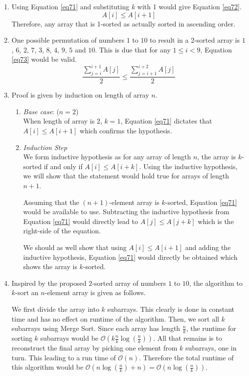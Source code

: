 \begin{enumerate}[label=(\alph*)]
\item Using Equation \ref{eq71} and substituting $k$ with 1 would give Equation \ref{eq72}.
\begin{equation}\label{eq72}
A[i] \leq A[i+1]
\end{equation}
Therefore, any array that is 1-sorted as actually sorted in ascending order.
\item One possible permutation of numbers $1$ to $10$ to result in a 2-sorted array is $1$, $6$, $2$, $7$, $3$, $8$, $4$, $9$, $5$ and $10$.
This is due that for any $1 \leq i < 9$, Equation \ref{eq73} would be valid.
\begin{equation}\label{eq73}
\frac{\sum_{j=i}^{i + 1} A[j]}{2} \leq \frac{\sum_{j=i+1}^{i + 2} A[j]}{2}
\end{equation}
\item Proof is given by induction on length of array $n$.
\begin{enumerate}
\item[] \textit{Base case}: ($n = 2$)\\
When length of array is 2, $k = 1$, Equation \ref{eq71} dictates that $A[i] \leq A[i+1]$ which confirms the hypothesis.
\item[] \textit{Induction Step}\\
We form inductive hypothesis as for any array of length $n$, the array is $k$-sorted if and only if $A[i] \leq A[i+k]$.
Using the inductive hypothesis, we will show that the statement would hold true for arrays of length $n + 1$.

Assuming that the $(n+1)$-element array is $k$-sorted, Equation \ref{eq71} would be available to use.
Subtracting the inductive hypothesis from Equation \ref{eq71} would directly lead to $A[j] \leq A[j+k]$ which is the right-side of the equation.

We should as well show that using $A[i] \leq A[i+1]$ and adding the inductive hypothesis, Equation \ref{eq71} would directly be obtained which shows the array is $k$-sorted.
\end{enumerate}
\item Inspired by the proposed $2$-sorted array of numbers $1$ to $10$, the algorithm to $k$-sort an $n$-element array is given as follows.

We first divide the array into $k$ subarrays.
This clearly is done in constant time and has no effect on runtime of the algorithm.
Then, we sort all $k$ subarrays using Merge Sort.
Since each array has length $\frac{n}{k}$, the runtime for sorting $k$ subarrays would be $\mathcal{O}(k\frac{n}{k}\log(\frac{n}{k}))$.
All that remains is to reconstruct the final array by picking one element from $k$ subarrays, one in turn.
This leading to a run time of $\mathcal{O}(n)$.
Therefore the total runtime of this algorithm would be $\mathcal{O}(n \log(\frac{n}{k}) + n ) = \mathcal{O}(n \log(\frac{n}{k}) )$.
\end{enumerate}
